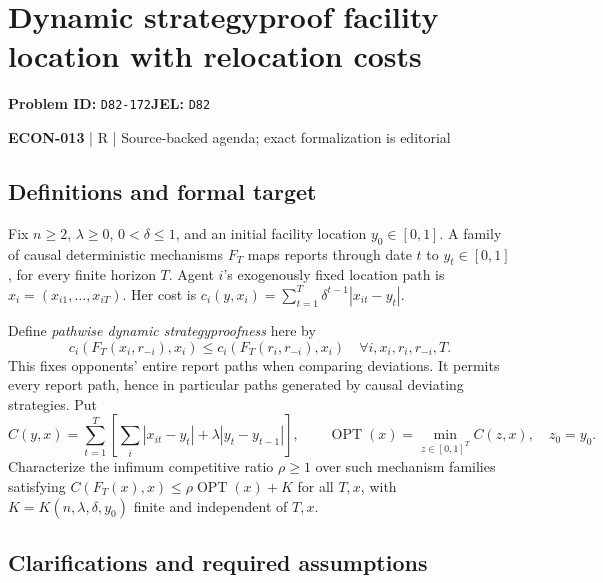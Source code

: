 \documentclass[11pt,a4paper]{article}
\begin{document}
\section*{Dynamic strategyproof facility location with relocation costs}
\textbf{Problem ID:} \texttt{D82-172}\quad \textbf{JEL:} \texttt{D82}\par
\label{problem:OP-0598}


\label{audited:ECON-013}

{\sffamily\small\color{muted}\textbf{ECON-013} | R | Source-backed agenda; exact formalization is editorial\par}

\subsection*{Definitions and formal target}

Fix $n\geq2$, $\lambda\geq0$, $0<\delta\leq1$, and an initial facility location $y_0\in[0,1]$. A family of causal deterministic mechanisms $F_T$ maps reports through date $t$ to $y_t\in[0,1]$, for every finite horizon $T$. Agent $i$'s exogenously fixed location path is $x_i=(x_{i1},\ldots,x_{iT})$. Her cost is $c_i(y,x_i)=\sum_{t=1}^T\delta^{t-1}|x_{it}-y_t|$.

Define \emph{pathwise dynamic strategyproofness} here by
\[
c_i(F_T(x_i,r_{-i}),x_i)\leq c_i(F_T(r_i,r_{-i}),x_i)
\quad\forall i,x_i,r_i,r_{-i},T.
\]
This fixes opponents' entire report paths when comparing deviations. It permits every report path, hence in particular paths generated by causal deviating strategies. Put
\[
C(y,x)=\sum_{t=1}^T\left[\sum_i|x_{it}-y_t|+\lambda|y_t-y_{t-1}|\right],\qquad
\operatorname{OPT}(x)=\min_{z\in[0,1]^T}C(z,x),\quad z_0=y_0.
\]
Characterize the infimum competitive ratio $\rho\geq1$ over such mechanism families satisfying $C(F_T(x),x)\leq\rho\operatorname{OPT}(x)+K$ for all $T,x$, with $K=K(n,\lambda,\delta,y_0)$ finite and independent of $T,x$.

\subsection*{Clarifications and required assumptions}
\end{document}
